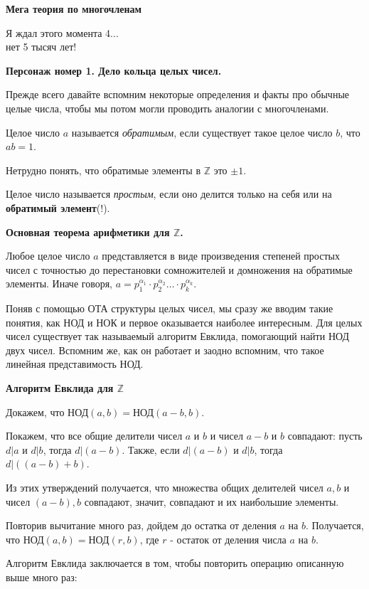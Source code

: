 \centerline{\bf \Huge Мега теория по многочленам}

\begin{flushright}
    \scriptsize{Я ждал этого момента 4...\\нет 5 тысяч лет!}
\end{flushright}

\textbf{\large \bf Персонаж номер 1. Дело кольца целых чисел.}

Прежде всего давайте вспомним некоторые определения и факты про обычные целые числа, чтобы мы потом могли проводить аналогии с многочленами.

Целое число $a$ называется \textit{обратимым}, если существует такое целое число $b$, что $ab=1$.

Нетрудно понять, что обратимые элементы в $\mathbb{Z}$ это $\pm 1$.

Целое число называется \textit{простым}, если оно делится только на себя или на \textbf{обратимый элемент}(!).

\textbf{Основная теорема арифметики для $\mathbb{Z}$.}

Любое целое число $a$ представляется в виде произведения степеней простых чисел с точностью до перестановки сомножителей и домножения на обратимые элементы. Иначе говоря, $a = p_1^{\alpha_1}\cdot p_2^{\alpha_2} \dotsc \cdot p_k^{\alpha_k}$. 

Поняв с помощью ОТА структуры целых чисел, мы сразу же вводим такие понятия, как НОД и НОК и первое оказывается наиболее интересным. Для целых чисел существует так называемый алгоритм Евклида, помогающий найти НОД двух чисел. Вспомним же, как он работает и заодно вспомним, что такое линейная представимость НОД.

\textbf{Алгоритм Евклида для $\mathbb{Z}$}

Докажем, что $\text{НОД}(a,b)=\text{НОД}(a-b,b)$.

Покажем, что все общие делители чисел $a$ и $b$ и чисел $a-b$ и $b$ совпадают: пусть $d|a$ и $d|b$, тогда $d|(a-b)$. Также, если $d|(a-b)$ и $d|b$, тогда $d|((a-b)+b)$.

Из этих утверждений получается, что множества общих делителей чисел $a,b$ и чисел $(a-b),b$ совпадают, значит, совпадают и их наибольшие элементы. 

Повторив вычитание много раз, дойдем до остатка от деления $a$ на $b$. Получается, что  $\text{НОД}(a,b)=\text{НОД}(r,b)$, где $r$ - остаток от деления числа $a$ на $b$.

Алгоритм Евклида заключается в том, чтобы повторить операцию описанную выше много раз: 

